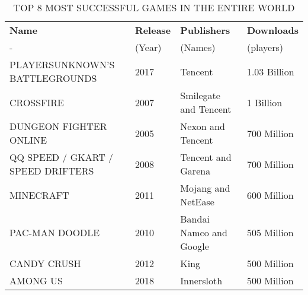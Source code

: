 \documentclass{article}
\begin{document}
	\begin{table}[h!]
	\begin{center}
		\caption{TOP 8 MOST SUCCESSFUL GAMES IN THE ENTIRE WORLD}
		\label{tab:}
		\begin{tabular}{l|l|l|l}
	      \textbf{Name} & \textbf{Release} & \textbf{Publishers} & \textbf{Downloads}\\
			- & (Year) & (Names) & (players)\\
			\hline
			PLAYERSUNKNOWN'S BATTLEGROUNDS & 2017 & Tencent & 1.03 Billion\\
			CROSSFIRE & 2007 & Smilegate and Tencent & 1 Billion\\
			DUNGEON FIGHTER ONLINE & 2005 & Nexon and Tencent & 700 Million\\
			QQ SPEED / GKART / SPEED DRIFTERS & 2008 & Tencent and Garena & 700 Million\\
			MINECRAFT & 2011 & Mojang and NetEase & 600 Million\\
			PAC-MAN DOODLE & 2010 & Bandai Namco and Google & 505 Million\\
			CANDY CRUSH & 2012 & King & 500 Million\\
			AMONG US & 2018 & Innersloth & 500 Million\\
		\end{tabular}
	\end{center}
\end{table}
\end{document}
